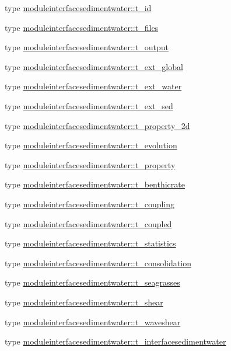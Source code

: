\begin{DoxyCompactItemize}
\item 
type \mbox{\hyperlink{structmoduleinterfacesedimentwater_1_1t__id}{moduleinterfacesedimentwater\+::t\+\_\+id}}
\item 
type \mbox{\hyperlink{structmoduleinterfacesedimentwater_1_1t__files}{moduleinterfacesedimentwater\+::t\+\_\+files}}
\item 
type \mbox{\hyperlink{structmoduleinterfacesedimentwater_1_1t__output}{moduleinterfacesedimentwater\+::t\+\_\+output}}
\item 
type \mbox{\hyperlink{structmoduleinterfacesedimentwater_1_1t__ext__global}{moduleinterfacesedimentwater\+::t\+\_\+ext\+\_\+global}}
\item 
type \mbox{\hyperlink{structmoduleinterfacesedimentwater_1_1t__ext__water}{moduleinterfacesedimentwater\+::t\+\_\+ext\+\_\+water}}
\item 
type \mbox{\hyperlink{structmoduleinterfacesedimentwater_1_1t__ext__sed}{moduleinterfacesedimentwater\+::t\+\_\+ext\+\_\+sed}}
\item 
type \mbox{\hyperlink{structmoduleinterfacesedimentwater_1_1t__property__2d}{moduleinterfacesedimentwater\+::t\+\_\+property\+\_\+2d}}
\item 
type \mbox{\hyperlink{structmoduleinterfacesedimentwater_1_1t__evolution}{moduleinterfacesedimentwater\+::t\+\_\+evolution}}
\item 
type \mbox{\hyperlink{structmoduleinterfacesedimentwater_1_1t__property}{moduleinterfacesedimentwater\+::t\+\_\+property}}
\item 
type \mbox{\hyperlink{structmoduleinterfacesedimentwater_1_1t__benthicrate}{moduleinterfacesedimentwater\+::t\+\_\+benthicrate}}
\item 
type \mbox{\hyperlink{structmoduleinterfacesedimentwater_1_1t__coupling}{moduleinterfacesedimentwater\+::t\+\_\+coupling}}
\item 
type \mbox{\hyperlink{structmoduleinterfacesedimentwater_1_1t__coupled}{moduleinterfacesedimentwater\+::t\+\_\+coupled}}
\item 
type \mbox{\hyperlink{structmoduleinterfacesedimentwater_1_1t__statistics}{moduleinterfacesedimentwater\+::t\+\_\+statistics}}
\item 
type \mbox{\hyperlink{structmoduleinterfacesedimentwater_1_1t__consolidation}{moduleinterfacesedimentwater\+::t\+\_\+consolidation}}
\item 
type \mbox{\hyperlink{structmoduleinterfacesedimentwater_1_1t__seagrasses}{moduleinterfacesedimentwater\+::t\+\_\+seagrasses}}
\item 
type \mbox{\hyperlink{structmoduleinterfacesedimentwater_1_1t__shear}{moduleinterfacesedimentwater\+::t\+\_\+shear}}
\item 
type \mbox{\hyperlink{structmoduleinterfacesedimentwater_1_1t__waveshear}{moduleinterfacesedimentwater\+::t\+\_\+waveshear}}
\item 
type \mbox{\hyperlink{structmoduleinterfacesedimentwater_1_1t__interfacesedimentwater}{moduleinterfacesedimentwater\+::t\+\_\+interfacesedimentwater}}
\end{DoxyCompactItemize}
